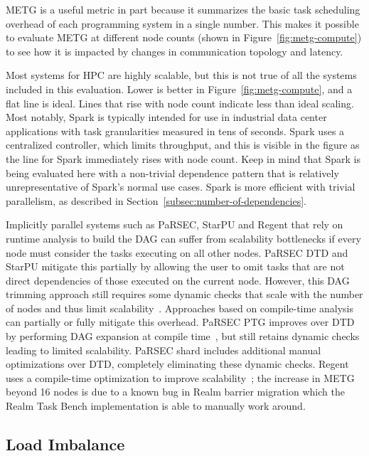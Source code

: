 


METG is a useful metric in part because it summarizes the basic task
scheduling overhead of each programming system in a single number. This makes it
possible to evaluate METG at different node counts (shown in
Figure~\ref{fig:metg-compute}) to see how it is impacted by changes in
communication topology and latency.

Most systems for HPC are highly scalable,
but this is not true of all the systems included in this
evaluation. Lower is better in Figure~\ref{fig:metg-compute}, and a
flat line is ideal. Lines that rise with node count indicate less than
ideal scaling. Most notably, Spark is typically
intended for use in industrial data center applications with task
granularities measured in tens of seconds. Spark uses a centralized
controller, which limits throughput, and this is visible in the figure
as the line for Spark immediately rises with node count. Keep in mind
that Spark is being evaluated here with a non-trivial dependence
pattern that is relatively unrepresentative of Spark's normal use
cases. Spark is more efficient with trivial parallelism, as described
in Section~\ref{subsec:number-of-dependencies}.

Implicitly parallel systems such as PaRSEC, StarPU and Regent that
rely on runtime analysis to build the DAG can suffer from
scalability bottlenecks if every node must consider the tasks
executing on all other nodes. PaRSEC DTD and StarPU mitigate this
partially by allowing the user to omit tasks that are not direct
dependencies of those executed on the current node. However, this DAG
trimming approach still requires some dynamic checks that scale with
the number of nodes and thus limit scalability~\cite{PARSEC_DTD}. Approaches based on compile-time analysis can
partially or fully mitigate this overhead. PaRSEC PTG improves over DTD 
by performing DAG expansion at compile time~\cite{PARSEC_DTD}, but
still retains dynamic checks leading to limited scalability. PaRSEC shard includes additional manual optimizations over DTD, completely eliminating these dynamic checks. Regent
uses a compile-time optimization to improve
scalability~\cite{ControlReplication17}; the increase in METG beyond 16 nodes is due to a known bug in Realm barrier migration which the Realm Task Bench implementation is able to manually work around.



\subsection{Load Imbalance}

